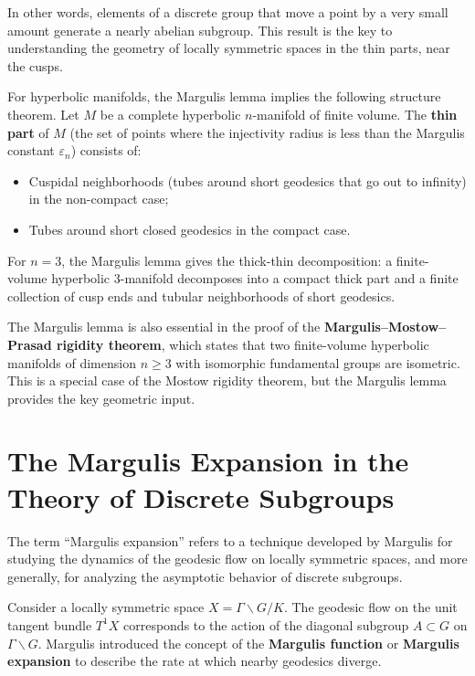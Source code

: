 In other words, elements of a discrete group that move a point by a very small amount generate a nearly abelian subgroup. This result is the key to understanding the geometry of locally symmetric spaces in the thin parts, near the cusps.

For hyperbolic manifolds, the Margulis lemma implies the following structure theorem. Let \(M\) be a complete hyperbolic \(n\)-manifold of finite volume. The \textbf{thin part} of \(M\) (the set of points where the injectivity radius is less than the Margulis constant \(\varepsilon_n\)) consists of:
\begin{itemize}
    \item Cuspidal neighborhoods (tubes around short geodesics that go out to infinity) in the non-compact case;
    \item Tubes around short closed geodesics in the compact case.
\end{itemize}

For \(n = 3\), the Margulis lemma gives the thick-thin decomposition: a finite-volume hyperbolic 3-manifold decomposes into a compact thick part and a finite collection of cusp ends and tubular neighborhoods of short geodesics.

The Margulis lemma is also essential in the proof of the \textbf{Margulis--Mostow--Prasad rigidity theorem}, which states that two finite-volume hyperbolic manifolds of dimension \(n \geq 3\) with isomorphic fundamental groups are isometric. This is a special case of the Mostow rigidity theorem, but the Margulis lemma provides the key geometric input.

\section{The Margulis Expansion in the Theory of Discrete Subgroups}

The term ``Margulis expansion'' refers to a technique developed by Margulis for studying the dynamics of the geodesic flow on locally symmetric spaces, and more generally, for analyzing the asymptotic behavior of discrete subgroups.

Consider a locally symmetric space \(X = \Gamma \backslash G/K\). The geodesic flow on the unit tangent bundle \(T^1 X\) corresponds to the action of the diagonal subgroup \(A \subset G\) on \(\Gamma \backslash G\). Margulis introduced the concept of the \textbf{Margulis function} or \textbf{Margulis expansion} to describe the rate at which nearby geodesics diverge.

